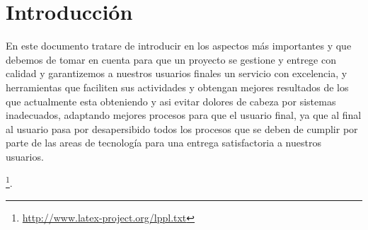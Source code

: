 \documentclass[
	article,			%
	11pt,				%
	oneside,			%
	a4paper,			%
	english,			%
	brazil,				%
	sumario=tradicional
	]{abntex2}
\begin{document}

\textual

\section*{Introducción}

En este documento tratare de introducir en los aspectos más importantes y que debemos de tomar en cuenta para que un proyecto se gestione y entrege con calidad y garantizemos a nuestros usuarios finales un servicio con excelencia, y herramientas que faciliten sus actividades y obtengan mejores resultados de los que actualmente esta obteniendo y asi evitar dolores de cabeza por sistemas inadecuados, adaptando mejores procesos para que el usuario final, ya que al final al usuario pasa por desapersibido todos los procesos que se deben de cumplir por parte de las areas de tecnología para una entrega satisfactoria a nuestros usuarios.

\footnote{\url{http://www.latex-project.org/lppl.txt}}.


\end{document}
